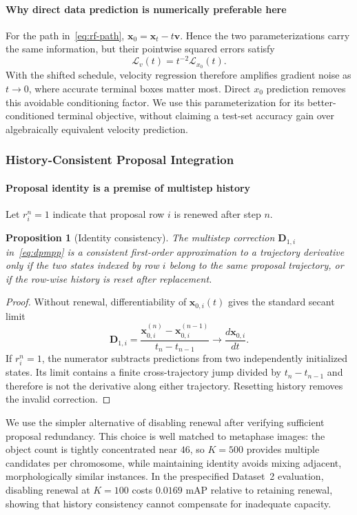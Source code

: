 \documentclass[journal,10pt]{IEEEtran}
\newtheorem{proposition}{Proposition}
\theoremstyle{definition}
\begin{document}
\paragraph{Why direct data prediction is numerically preferable here}
For the path in~\eqref{eq:rf-path},
$\mathbf{x}_0=\mathbf{x}_t-t\mathbf{v}$. Hence the two parameterizations carry
the same information, but their pointwise squared errors satisfy
\begin{equation}\label{eq:x0-v-weight}
 \mathcal{L}_{v}(t)=t^{-2}\mathcal{L}_{x_0}(t).
\end{equation}
With the shifted schedule, velocity regression therefore amplifies gradient
noise as $t\rightarrow0$, where accurate terminal boxes matter most. Direct
$x_0$ prediction removes this avoidable conditioning factor. We use this
parameterization for its better-conditioned terminal objective, without
claiming a test-set accuracy gain over algebraically equivalent velocity
prediction.

\subsubsection{History-Consistent Proposal Integration}
\label{sec:method-engineering}

\paragraph{Proposal identity is a premise of multistep history}
Let $r_i^n=1$ indicate that proposal row $i$ is renewed after step $n$.
\begin{proposition}[Identity consistency]\label{prop:identity}
The multistep correction $\mathbf{D}_{1,i}$ in~\eqref{eq:dpmpp} is a
consistent first-order approximation to a trajectory derivative only if the
two states indexed by row $i$ belong to the same proposal trajectory, or if
the row-wise history is reset after replacement.
\end{proposition}
\begin{proof}
Without renewal, differentiability of $\mathbf{x}_{0,i}(t)$ gives the standard
secant limit
\begin{equation}
 \mathbf{D}_{1,i}=
 \frac{\mathbf{x}_{0,i}^{(n)}-\mathbf{x}_{0,i}^{(n-1)}}{t_n-t_{n-1}}
 \longrightarrow \frac{d\mathbf{x}_{0,i}}{dt}.
\end{equation}
If $r_i^n=1$, the numerator subtracts predictions from two independently
initialized states. Its limit contains a finite cross-trajectory jump divided
by $t_n-t_{n-1}$ and therefore is not the derivative along either trajectory.
Resetting history removes the invalid correction. \qedhere
\end{proof}
We use the simpler alternative of disabling renewal after verifying sufficient
proposal redundancy. This choice is well matched to metaphase images: the
object count is tightly concentrated near $46$, so $K=500$ provides multiple
candidates per chromosome, while maintaining identity avoids mixing adjacent,
morphologically similar instances. In the prespecified Dataset~2 evaluation,
disabling renewal at $K=100$ costs $0.0169$ mAP relative to retaining renewal,
showing that history consistency cannot compensate for inadequate capacity.
\end{document}
